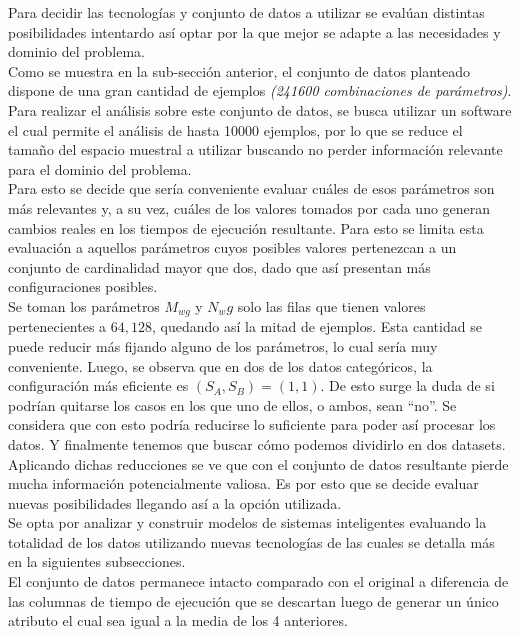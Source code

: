 \documentclass[osajnl,twocolumn,showpacs,superscriptaddress,10pt]{revtex4-1} %
\begin{document}
Para decidir las tecnologías y conjunto de datos a utilizar se evalúan distintas posibilidades intentardo así optar por la que mejor se adapte a las necesidades y dominio del problema. \\

Como se muestra en la sub-sección anterior, el conjunto de datos planteado dispone de una gran cantidad de ejemplos \textit{(241600 combinaciones de parámetros)}. Para realizar el análisis sobre este conjunto de datos, se busca utilizar un software el cual permite el análisis de hasta 10000 ejemplos, por lo que se reduce el tamaño del espacio muestral a utilizar buscando no perder información relevante para el dominio del problema. \\

Para esto se decide que sería conveniente evaluar cuáles de esos parámetros son más relevantes y, a su vez, cuáles de los valores tomados por cada uno generan cambios reales en los tiempos de ejecución resultante. Para esto se limita esta evaluación a aquellos parámetros cuyos posibles valores pertenezcan a un conjunto de cardinalidad mayor que dos, dado que así presentan más configuraciones posibles. \\

Se toman los parámetros $M_{wg}$ y $N_wg$ solo las filas que tienen valores pertenecientes a ${64, 128}$, quedando así la mitad de ejemplos. Esta cantidad se puede reducir más fijando alguno de los parámetros, lo cual sería muy conveniente. Luego, se observa que en dos de los datos categóricos, la configuración más eficiente es $(S_{A}, S_{B}) = (1, 1)$. De esto surge la duda de si podrían quitarse los casos en los que uno de ellos, o ambos, sean “no”. Se considera que con esto podría reducirse lo suficiente para poder así procesar los datos. Y finalmente tenemos que buscar cómo podemos dividirlo en dos datasets. \\

Aplicando dichas reducciones se ve que con el conjunto de datos resultante pierde mucha información potencialmente valiosa. Es por esto que se decide evaluar nuevas posibilidades llegando así a la opción utilizada. \\

Se opta por analizar y construir modelos de sistemas inteligentes evaluando la totalidad de los datos utilizando nuevas tecnologías de las cuales se detalla más en la siguientes subsecciones. \\

El conjunto de datos permanece intacto comparado con el original a diferencia de las columnas de tiempo de ejecución que se descartan luego de generar un único atributo el cual sea igual a la media de los 4 anteriores. \\
\end{document}
